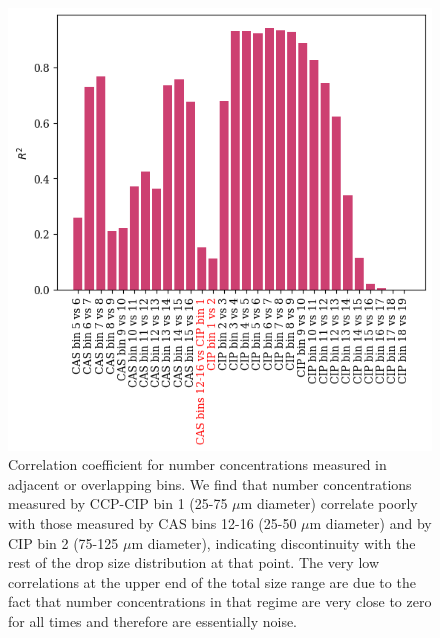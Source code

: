 \documentclass{article}
\begin{document}
\begin{figure}[ht]
	\centering
	\includegraphics[width=\textwidth]{halo/bin_correlations_figure.png}
	\caption{Correlation coefficient for number concentrations measured in adjacent or overlapping bins. We find that number concentrations measured by CCP-CIP bin 1 (25-75 $\mu$m diameter) correlate poorly with those measured by CAS bins 12-16 (25-50 $\mu$m diameter) and by CIP bin 2 (75-125 $\mu$m diameter), indicating discontinuity with the rest of the drop size distribution at that point. The very low correlations at the upper end of the total size range are due to the fact that number concentrations in that regime are very close to zero for all times and therefore are essentially noise.}
	\label{cipbin1corr}
\end{figure}
\end{document}
